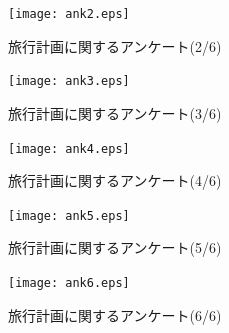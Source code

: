 \documentclass{funthesis}
\begin{document}
\begin{figure}[htpb]
\begin{center}
\texttt{[image: ank2.eps]}
\caption{旅行計画に関するアンケート(2/6)}
\end{center}
\end{figure}

\begin{figure}[htpb]
\begin{center}
\texttt{[image: ank3.eps]}
\caption{旅行計画に関するアンケート(3/6)}
\end{center}
\end{figure}

\begin{figure}[htpb]
\begin{center}
\texttt{[image: ank4.eps]}
\caption{旅行計画に関するアンケート(4/6)}
\end{center}
\end{figure}

\begin{figure}[htpb]
\begin{center}
\texttt{[image: ank5.eps]}
\caption{旅行計画に関するアンケート(5/6)}
\end{center}
\end{figure}

\begin{figure}[htpb]
\begin{center}
\texttt{[image: ank6.eps]}
\caption{旅行計画に関するアンケート(6/6)}
\end{center}
\end{figure}



\listoffigures

\listoftables
\end{document}
